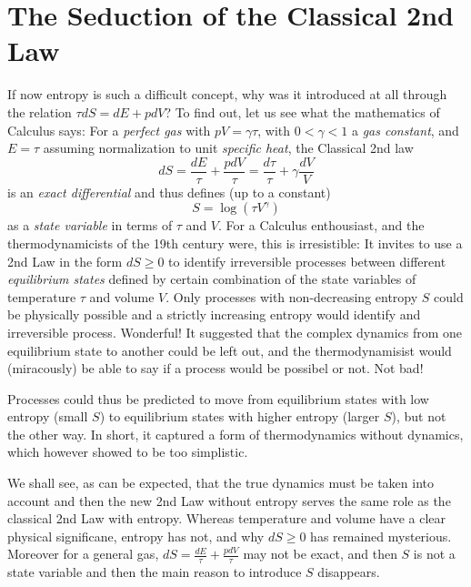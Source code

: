 \section{The Seduction of the Classical 2nd Law}

If now entropy is such a difficult concept, why was it introduced 
at all through the relation $\tau dS=dE+pdV$? To find out, let
us see what the mathematics of Calculus says: For a \emph{perfect gas} with $pV=\gamma\tau$,
with $0<\gamma <1$ a \emph{gas constant}, 
and $E=\tau$ assuming normalization to unit \emph{specific heat}, 
the Classical 2nd law  
\[
dS=\frac{dE}{\tau}+\frac{pdV}{\tau}=
\frac{d\tau}{\tau}+\gamma\frac{dV}{V}
\]
is an \emph{exact differential} and thus 
defines (up to a constant) 
\[
S=\log(\tau V^{\gamma})
\]
as a \emph{state variable} in terms of $\tau$ and $V$. For a Calculus
enthousiast, and the thermodynamicists of the 19th century
were, this is irresistible: It invites to use a 
2nd Law in the form $dS\ge 0$ to identify irreversible
processes between different \emph{equilibrium states} 
defined by certain combination of the state variables of temperature
$\tau$ and volume $V$. Only processes with non-decreasing entropy $S$
could be physically possible and a strictly increasing entropy 
would identify and irreversible process. Wonderful!  It suggested 
that the complex dynamics from one equilibrium state to another could be 
left out, and the thermodynamisist would (miracously) 
be able to say if a process would be possibel or not. Not bad!

Processes could thus be predicted to move 
from equilibrium states with low entropy (small $S$) to equilibrium
states with higher entropy (larger $S$), but not the other way.
In short, it captured a form of thermodynamics without
dynamics, which however showed to be too simplistic.

We shall see, as can be expected, that the true dynamics must be taken 
into account and then the new 2nd Law without entropy
serves the same role as the classical 2nd Law with entropy. 
Whereas temperature and volume have a clear physical significane, 
entropy has not, and why $dS\ge 0$ has remained mysterious.
Moreover for a general gas, $dS=\frac{dE}{\tau}+\frac{pdV}{\tau}$ 
may not be exact, and then $S$ is not a state variable
and then the main reason to introduce $S$ disappears.


